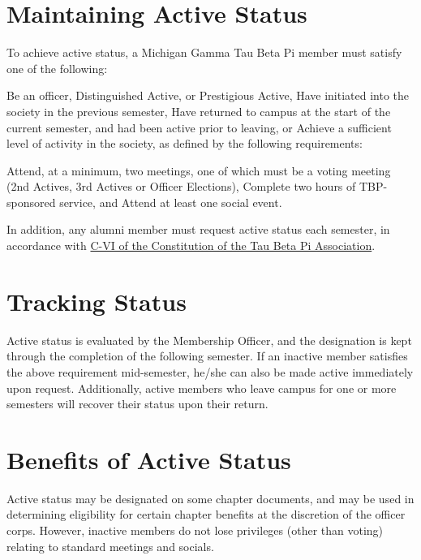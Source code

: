 \section{Maintaining Active Status} To achieve active status, a Michigan Gamma Tau Beta Pi member must satisfy one of the following:
\begin{enumsubsection} %
\itemnotoc	Be an officer, Distinguished Active, or Prestigious Active,
\itemnotoc	Have initiated into the society in the previous semester,
\itemnotoc	Have returned to campus at the start of the current semester, and had been active prior to leaving, or
\itemnotoc	Achieve a sufficient level of activity in the society, as defined by the following requirements:
\begin{enumsubsubsection}
\itemnotoc	Attend, at a minimum, two meetings, one of which must be a voting meeting (2nd Actives, 3rd Actives or Officer Elections),
\itemnotoc	Complete two hours of TBP-sponsored service, and
\itemnotoc	Attend at least one social event.
\end{enumsubsubsection} 
\end{enumsubsection} 
In addition, any alumni member must request active status each semester, in accordance with \href{http://www.tbp.org/off/ConstBylaw.pdf}{C-VI of the Constitution of the Tau Beta Pi Association}.

\section{Tracking Status}  Active status is evaluated by the Membership Officer, and the designation is kept through the completion of the following semester.  If an inactive member satisfies the above requirement mid-semester, he/she can also be made active immediately upon request.  Additionally, active members who leave campus for one or more semesters will recover their status upon their return.
\section{Benefits of Active Status}  Active status may be designated on some chapter documents, and may be used in determining eligibility for certain chapter benefits at the discretion of the officer corps.  However, inactive members do not lose privileges (other than voting) relating to standard meetings and socials.